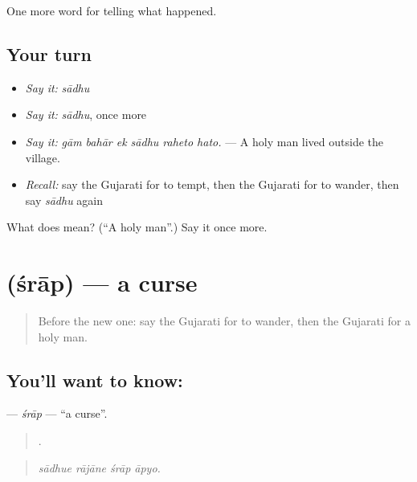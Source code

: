 \begin{grammarlens}[title={What you've built}]
One more word for telling what happened.
\end{grammarlens}

\subsection*{Your turn}
\begin{itemize}
\raggedright
  \item \emph{Say it:} \emph{sādhu}
  \item \emph{Say it:} \emph{sādhu}, once more
  \item \emph{Say it:} \emph{gām bahār ek sādhu raheto hato.} — A holy man lived outside the village.
  \item \emph{Recall:} say the Gujarati for to tempt, then the Gujarati for to wander, then say \emph{sādhu} again
\end{itemize}

\begin{tcolorbox}[breakable,colback=teal!4,colframe=teal!35!black,title={Before you move on}]
What does  mean? (\textquotedblleft{}A holy man\textquotedblright{}.) Say it once more.
\end{tcolorbox}
\section[\texorpdfstring{\gu{શ્રાપ} (śrāp)}{શ્રાપ (śrāp)}]{ (śrāp) — a curse}

\label{lesson:GU-C335-srap}



\begin{quote}
Before the new one: say the Gujarati for to wander, then the Gujarati for a holy man.
\end{quote}

\subsection*{You'll want to know: }
\textbf{} — \emph{śrāp} — \textquotedblleft{}a curse\textquotedblright{}.

\begin{quote}
   .
\end{quote}

\begin{quote}
\emph{sādhue rājāne śrāp āpyo.}
\end{quote}

